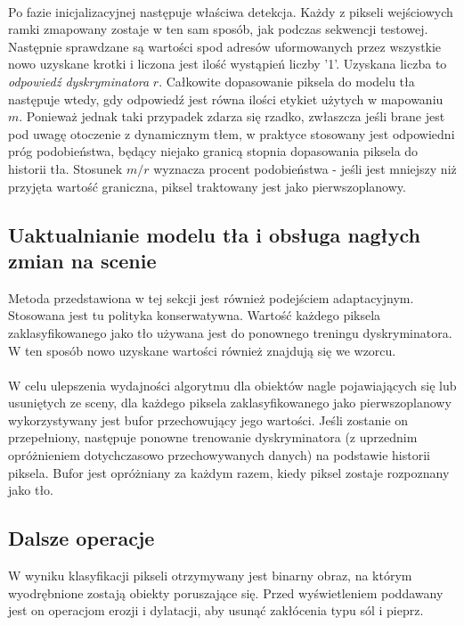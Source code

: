 \paragraph{}
Po fazie inicjalizacyjnej następuje właściwa detekcja. Każdy z pikseli wejściowych ramki zmapowany zostaje w ten sam sposób, jak podczas sekwencji testowej. Następnie sprawdzane są wartości spod adresów uformowanych przez wszystkie nowo uzyskane krotki i liczona jest ilość wystąpień liczby '1'. Uzyskana liczba to \textit{odpowiedź dyskryminatora} $r$. Całkowite dopasowanie piksela do modelu tła następuje wtedy, gdy odpowiedź jest równa ilości etykiet użytych w mapowaniu $m$. Ponieważ jednak taki przypadek zdarza się rzadko, zwłaszcza jeśli brane jest pod uwagę otoczenie z dynamicznym tłem, w praktyce stosowany jest odpowiedni próg podobieństwa, będący niejako granicą stopnia dopasowania piksela do historii tła. Stosunek $m/r$ wyznacza procent podobieństwa - jeśli jest mniejszy niż przyjęta wartość graniczna, piksel traktowany jest jako pierwszoplanowy.
\subsection{Uaktualnianie modelu tła i obsługa nagłych zmian na scenie}
Metoda przedstawiona w tej sekcji jest również podejściem adaptacyjnym. Stosowana jest tu polityka konserwatywna. Wartość każdego piksela zaklasyfikowanego jako tło używana jest do ponownego treningu dyskryminatora. W ten sposób nowo uzyskane wartości również znajdują się we wzorcu.
\paragraph{}
W celu ulepszenia wydajności algorytmu dla obiektów nagle pojawiających się lub usuniętych ze sceny, dla każdego piksela zaklasyfikowanego jako pierwszoplanowy wykorzystywany jest bufor przechowujący jego wartości. Jeśli zostanie on przepełniony, następuje ponowne trenowanie dyskryminatora (z uprzednim opróżnieniem dotychczasowo przechowywanych danych) na podstawie historii piksela. Bufor jest opróżniany za każdym razem, kiedy piksel zostaje rozpoznany jako tło.
\subsection{Dalsze operacje}
W wyniku klasyfikacji pikseli otrzymywany jest binarny obraz, na którym wyodrębnione zostają obiekty poruszające się. Przed wyświetleniem poddawany jest on operacjom erozji i dylatacji, aby usunąć zakłócenia typu sól i pieprz.
